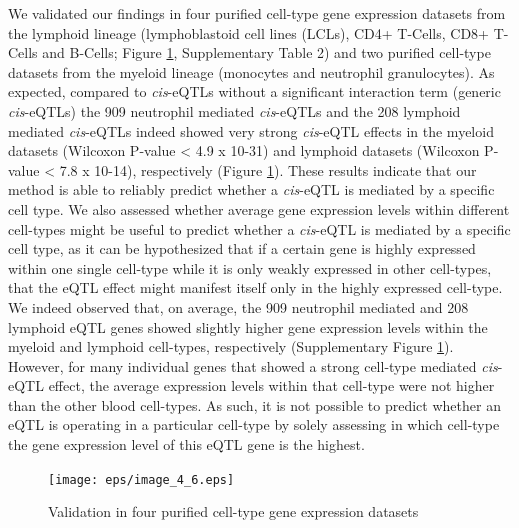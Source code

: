   We validated our findings in four purified cell-type gene expression datasets from the lymphoid 
  lineage (lymphoblastoid cell lines (LCLs), CD4+ T-Cells, CD8+ T-Cells and B-Cells; Figure \ref{fig:fig4_6}, 
  Supplementary Table 2) and two purified cell-type datasets from the myeloid lineage (monocytes and 
  neutrophil granulocytes). As expected, compared to \emph{cis}-eQTLs without a significant interaction term 
  (generic \emph{cis}-eQTLs) the 909 neutrophil mediated \emph{cis}-eQTLs and the 208 lymphoid mediated \emph{cis}-eQTLs 
  indeed showed very strong \emph{cis}-eQTL effects in the myeloid datasets (Wilcoxon P-value < 4.9 x 10-31) 
  and lymphoid datasets (Wilcoxon P-value < 7.8 x 10-14), respectively (Figure \ref{fig:fig4_6}). These results 
  indicate that our method is able to reliably predict whether a \emph{cis}-eQTL is mediated by a specific 
  cell type. We also assessed whether average gene expression levels within different cell-types might 
  be useful to predict whether a \emph{cis}-eQTL is mediated by a specific cell type, as it can be hypothesized 
  that if a certain gene is highly expressed within one single cell-type while it is only weakly 
  expressed in other cell-types, that the eQTL effect might manifest itself only in the highly expressed 
  cell-type. We indeed observed that, on average, the 909 neutrophil mediated and 208 lymphoid eQTL 
  genes showed slightly higher gene expression levels within the myeloid and lymphoid cell-types, 
  respectively (Supplementary Figure \ref{fig:fig4_6}). However, for many individual genes that showed a strong 
  cell-type mediated \emph{cis}-eQTL effect, the average expression levels within that cell-type were not 
  higher than the other blood cell-types. As such, it is not possible to predict whether an eQTL is 
  operating in a particular cell-type by solely assessing in which cell-type the gene expression level 
  of this eQTL gene is the highest.

  \begin{figure}[h!]
  \centering
  \texttt{[image: eps/image\_4\_6.eps]}
  \caption[Validation]{Validation in four purified cell-type gene expression datasets}
          \label{fig:fig4_6}
  \end{figure}

